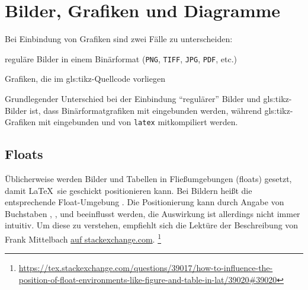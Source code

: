 \section[Bilder, Grafiken und Diagramme]{Bilder, Grafiken und Diagramme}
\label{sec:Bilder}
%
Bei Einbindung von Grafiken sind zwei Fälle zu unterscheiden:
\begin{itemize*}
  \item reguläre Bilder in einem Binärformat
	      (\texttt{PNG}, \texttt{TIFF}, \texttt{JPG}, \texttt{PDF}, etc.)
	\item {}Grafiken, die im \gls{gls:tikz}-Quellcode vorliegen 
\end{itemize*}

Grundlegender Unterschied bei der Einbindung \enquote{regulärer} Bilder
und \gls{gls:tikz}-Bilder ist, dass Binärformatgrafiken mit 
eingebunden werden, während \gls{gls:tikz}-Grafiken mit  eingebunden
und von \texttt{latex} mitkompiliert werden.


\subsection[Floats]{Floats}%
\label{sec:Floats}
%
Üblicherweise werden Bilder und Tabellen in Fließumgebungen (floats) gesetzt,
damit \LaTeX\ sie geschickt positionieren kann.
Bei Bildern heißt die entsprechende Float-Umgebung .
Die Positionierung kann durch Angabe von Buchstaben
, ,  und 
beeinflusst werden, die Auswirkung ist allerdings nicht immer intuitiv.
Um diese zu verstehen, empfiehlt sich die Lektüre der Beschreibung
von Frank Mittelbach
\href{https://tex.stackexchange.com/questions/39017/how-to-influence-the-position-of-float-environments-like-figure-and-table-in-lat/39020#39020}{auf stackexchange.com}.%
\footnote{\url{https://tex.stackexchange.com/questions/39017/how-to-influence-the-position-of-float-environments-like-figure-and-table-in-lat/39020#39020}}

